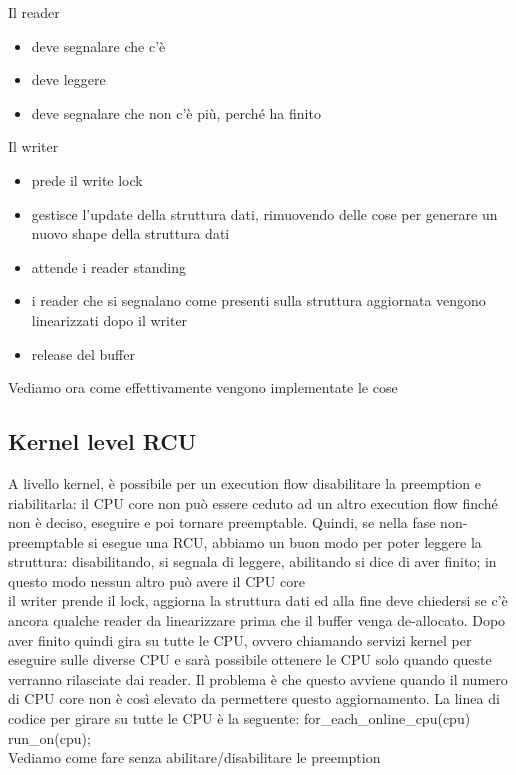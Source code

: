 \documentclass[12pt, oneside]{extbook}
\begin{document}
Il reader
\begin{itemize}
\item deve segnalare che c'è
\item deve leggere
\item deve segnalare che non c'è più, perché ha finito
\end{itemize}
Il writer
\begin{itemize}
\item prede il write lock
\item gestisce l'update della struttura dati, rimuovendo delle cose per generare un nuovo shape della struttura dati
\item attende i reader standing
\item i reader che si segnalano come presenti sulla struttura aggiornata vengono linearizzati dopo il writer
\item release del buffer
\end{itemize}
Vediamo ora come effettivamente vengono implementate le cose
\subsection{Kernel level RCU}
A livello kernel, è possibile per un execution flow disabilitare la preemption e riabilitarla: il CPU core non può essere ceduto ad un altro execution flow finché non è deciso, eseguire e poi tornare preemptable. Quindi, se nella fase non-preemptable si esegue una RCU, abbiamo un buon modo per poter leggere la struttura: disabilitando, si segnala di leggere, abilitando si dice di aver finito; in questo modo nessun altro può avere il CPU core\\ il writer prende il lock, aggiorna la struttura dati ed alla fine deve chiedersi se c'è ancora qualche reader da linearizzare prima che il buffer venga de-allocato. Dopo aver finito quindi gira su tutte le CPU, ovvero chiamando servizi kernel per eseguire sulle diverse CPU e sarà possibile ottenere le CPU solo quando queste verranno rilasciate dai reader. Il problema è che questo avviene quando il numero di CPU core non è così elevato da permettere questo aggiornamento. La linea di codice per girare su tutte le CPU è la seguente: \textsf{for\_each\_online\_cpu(cpu) run\_on(cpu);}\\ Vediamo come fare senza abilitare/disabilitare le preemption
\end{document}
